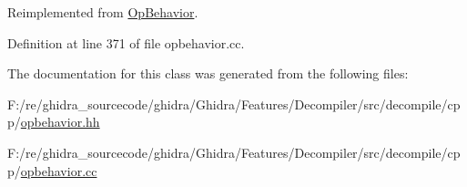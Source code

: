 Reimplemented from \mbox{\hyperlink{class_op_behavior_aeeed3af7aa35264b31a1f182884214a9}{Op\+Behavior}}.



Definition at line 371 of file opbehavior.\+cc.



The documentation for this class was generated from the following files\+:\begin{DoxyCompactItemize}
\item 
F\+:/re/ghidra\+\_\+sourcecode/ghidra/\+Ghidra/\+Features/\+Decompiler/src/decompile/cpp/\mbox{\hyperlink{opbehavior_8hh}{opbehavior.\+hh}}\item 
F\+:/re/ghidra\+\_\+sourcecode/ghidra/\+Ghidra/\+Features/\+Decompiler/src/decompile/cpp/\mbox{\hyperlink{opbehavior_8cc}{opbehavior.\+cc}}\end{DoxyCompactItemize}
